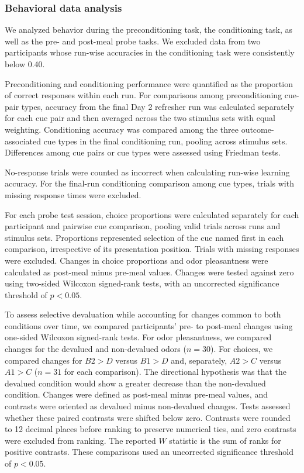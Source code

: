 \documentclass[12pt,letterpaper]{article}
\begin{document}
\subsubsection*{Behavioral data analysis}

We analyzed behavior during the preconditioning task, the conditioning task, as well as the pre- and post-meal probe tasks. We excluded data from two participants whose run-wise accuracies in the conditioning task were consistently below 0.40.

Preconditioning and conditioning performance were quantified as the proportion of correct responses within each run. For comparisons among preconditioning cue-pair types, accuracy from the final Day 2 refresher run was calculated separately for each cue pair and then averaged across the two stimulus sets with equal weighting. Conditioning accuracy was compared among the three outcome-associated cue types in the final conditioning run, pooling across stimulus sets. Differences among cue pairs or cue types were assessed using Friedman tests.

No-response trials were counted as incorrect when calculating run-wise learning accuracy. For the final-run conditioning comparison among cue types, trials with missing response times were excluded.

For each probe test session, choice proportions were calculated separately for each participant and pairwise cue comparison, pooling valid trials across runs and stimulus sets. Proportions represented selection of the cue named first in each comparison, irrespective of its presentation position. Trials with missing responses were excluded. Changes in choice proportions and odor pleasantness were calculated as post-meal minus pre-meal values. Changes were tested against zero using two-sided Wilcoxon signed-rank tests, with an uncorrected significance threshold of $p < 0.05$.

To assess selective devaluation while accounting for changes common to both conditions over time, we compared participants' pre- to post-meal changes using one-sided Wilcoxon signed-rank tests. For odor pleasantness, we compared changes for the devalued and non-devalued odors ($n = 30$). For choices, we compared changes for $B2>D$ versus $B1>D$ and, separately, $A2>C$ versus $A1>C$ ($n = 31$ for each comparison). The directional hypothesis was that the devalued condition would show a greater decrease than the non-devalued condition. Changes were defined as post-meal minus pre-meal values, and contrasts were oriented as devalued minus non-devalued changes. Tests assessed whether these paired contrasts were shifted below zero. Contrasts were rounded to 12 decimal places before ranking to preserve numerical ties, and zero contrasts were excluded from ranking. The reported $W$ statistic is the sum of ranks for positive contrasts. These comparisons used an uncorrected significance threshold of $p < 0.05$.
\end{document}
